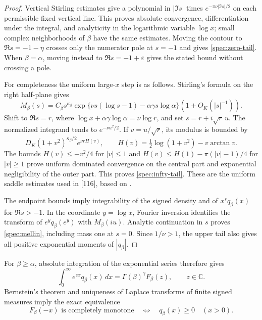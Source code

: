 \documentclass[11pt,a4paper]{article}
\theoremstyle{definition}
\theoremstyle{remark}
\numberwithin{equation}{section}
\begin{document}
\begin{proof}
Vertical Stirling estimates give a polynomial in \(|\Im s|\) times
\(e^{-\pi\nu|\Im s|/2}\) on each permissible fixed vertical line.
This proves absolute convergence, differentiation under the integral,
and analyticity in the logarithmic variable \(\log x\); small complex
neighborhoods of \(\beta\) have the same estimates.  Moving the contour
to \(\Re s=-1-\eta\) crosses only the numerator pole at \(s=-1\) and
gives \eqref{spec:zero-tail}.  When \(\beta=\alpha\), moving instead to
\(\Re s=-1+\varepsilon\) gives the stated bound without crossing a pole.

For completeness the uniform large-\(x\) step is as follows.  Stirling's
formula on the right half-plane gives
\[
 M_\beta(s)=C_\beta s^{\kappa_\beta}
 \exp\{\nu s(\log s-1)-\alpha\gamma s\log\alpha\}
 (1+O_K(|s|^{-1})).
\]
Shift to \(\Re s=r\), where
\(\log x+\alpha\gamma\log\alpha=\nu\log r\), and set
\(s=r+i\sqrt r\,u\).  The normalized integrand tends to
\(e^{-\nu u^2/2}\).  If \(v=u/\sqrt r\), its modulus is bounded by
\[
 D_K(1+v^2)^{\kappa_\beta/2}e^{\nu r H(v)},\qquad
 H(v)=\tfrac12\log(1+v^2)-v\arctan v.
\]
The bounds \(H(v)\le-v^2/4\) for \(|v|\le1\) and
\(H(v)\le H(1)-\pi(|v|-1)/4\) for \(|v|\ge1\) prove uniform
dominated convergence on the central part and exponential negligibility
of the outer part.  This proves \eqref{spec:infty-tail}.  These are the
uniform saddle estimates used in [116], based on \cite[Section~5.11]{DLMF}.

The endpoint bounds imply integrability of the signed density and of
\(x^s q_\beta(x)\) for \(\Re s>-1\).  In the coordinate \(y=\log x\),
Fourier inversion identifies the transform of \(e^yq_\beta(e^y)\)
with \(M_\beta(iu)\).  Analytic continuation in \(s\) proves
\eqref{spec:mellin}, including mass one at \(s=0\).
Since \(1/\nu>1\), the upper tail also gives all positive exponential
moments of \(|q_\beta|\).
\end{proof}

For \(\beta\ge\alpha\), absolute integration of the exponential series
therefore gives
\begin{equation}\label{spec:signed-laplace}
 \int_0^\infty e^{zx}q_\beta(x)\,dx
       =\Gamma(\beta)^\gamma F_\beta(z),\qquad z\in\mathbb C.
\end{equation}
Bernstein's theorem and uniqueness of Laplace transforms of finite
signed measures imply the exact equivalence
\begin{equation}\label{spec:CM-positive}
 F_\beta(-x)\text{ is completely monotone}
 \quad\Longleftrightarrow\quad q_\beta(x)\ge0\quad(x>0).
\end{equation}
\end{document}
